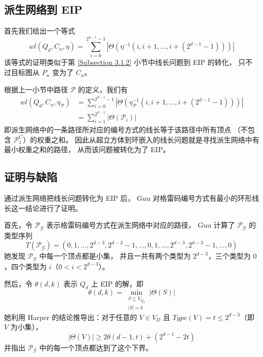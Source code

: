 \subsection{派生网络到 EIP}
\label{Subsection 3.2.2}

首先我们给出一个等式
\begin{equation}
wl(Q_d, C_n, \eta) = \sum_{i = 0}^{2^{d - 1} - 1}
|\Theta(\eta^{-1}(i, i + 1, \dots, i + (2^{d - 1} - 1)))|
\end{equation}
该等式的证明类似于第 \ref{Subsection 3.1.2} 小节中线长问题到 EIP 的转化，
只不过目标图从 $P_n$ 变为了 $C_n$。

根据上一小节中路径 $\mathcal{P}$ 的定义，我们有
\begin{align}
wl(Q_d, C_n, \eta_\mathcal{P}) & = \sum_{i = 0}^{2^{d - 1} - 1}
				   |\Theta(\eta_\mathcal{P}^{-1}(i, i + 1, \dots, i + (2^{d - 1} - 1)))| \\
			       & = \sum_{i = 1}^{2^{d - 1}} |\Theta(\mathcal{P}_i)|
\end{align}
即派生网络中的一条路径所对应的编号方式的线长等于该路径中所有顶点
（不包含 $\mathcal{P}_1^C$）的权重之和。
因此从超立方体到环嵌入的线长问题就是寻找派生网络中有最小权重之和的路径，
从而该问题被转化为了 EIP。

\subsection{证明与缺陷}
\label{Subsection 3.2.3}

通过派生网络把线长问题转化为 EIP 后，
Guu 对格雷码编号方式有最小的环形线长这一结论进行了证明。

首先，令 $\mathcal{P}_\mathcal{G}$ 表示格雷码编号方式在派生网络中对应的路径，
Guu 计算了 $\mathcal{P}_\mathcal{G}$ 的类型序列
\begin{equation}
T(\mathcal{P}_\mathcal{G}) = (0, 1, \dots, 2^{d - 3}, 2^{d - 3} - 1, \dots, 0, 1, \dots, 2^{d - 3}, 2^{d - 3} - 1, \dots, 0)
\end{equation}
她发现 $\mathcal{P}_\mathcal{G}$ 中每一个顶点都是小集，
并且一共有两个类型为 $2^{d - 3}$，三个类型为 $0$，四个类型为 $i$（$0 < i <2^{d - 3}$）。

然后，令 $\theta(d, k)$ 表示 $Q_d$ 上 EIP 的解，即
\begin{equation}
\theta(d, k) = \min_{\substack{
	S \subseteq V_{Q_d} \\
	|S| = k
}} |\Theta(S)|
\end{equation}
她利用 Harper 的结论推导出：对于任意的 $V \in V_D$ 且 $Type(V) = t \le 2^{d - 3}$（即 $V$ 为小集），
\begin{equation}
|\Theta(V)| \ge 2 \theta(d - 1, t) + (2^{d - 1} - 2 t)
\end{equation}
并指出 $\mathcal{P}_\mathcal{G}$ 中的每一个顶点都达到了这个下界。

